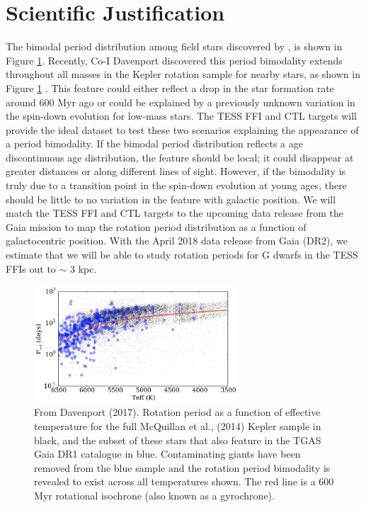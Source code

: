 \documentclass[useAMS, usenatbib, preprint, 12pt]{aastex}
\begin{document}
\section{Scientific Justification}

The bimodal period distribution among field stars discovered by
\citet{mcquillan2013}, is shown in Figure \ref{fig:davenport}.
Recently, Co-I Davenport discovered this period bimodality extends throughout
all masses in the Kepler rotation sample for nearby stars, as shown in Figure
\ref{fig:davenport} \citep{davenport2017}.
This feature could either reflect a drop in the star formation rate around 600
Myr ago or could be explained by a previously unknown variation in the
spin-down evolution for low-mass stars.
The TESS FFI and CTL targets will provide the ideal dataset to test these two
scenarios explaining the appearance of a period bimodality.
If the bimodal period distribution reflects a age discontinuous age
distribution, the feature should be local; it could
disappear at greater distances or along different lines of sight.
However, if the bimodality is truly due to a transition point in the spin-down
evolution at young ages, there should be little to no variation in the feature
with galactic position.
We will match the TESS FFI and CTL targets to the upcoming data
release from the Gaia mission \citep{perryman2001} to map the rotation period
distribution as a function of galactocentric position.
With the April 2018 data release from Gaia (DR2), we estimate that we will be
able to study rotation periods for G dwarfs in the TESS FFIs out to $\sim$ 3
kpc.


\begin{figure}
\begin{center}
\includegraphics[width=3in, clip=true]{Davenport.png}
\caption{From Davenport (2017).
    Rotation period as a function of effective
temperature for the full McQuillan et al., (2014) Kepler sample in black, and
the subset of these stars that also feature in the TGAS Gaia DR1 catalogue in
blue. Contaminating giants have been removed from the blue sample and the
rotation period bimodality is revealed to exist across all temperatures shown.
    The red line is a 600 Myr rotational isochrone (also known as a gyrochrone).}
\label{fig:davenport}
\end{center}
\end{figure}
\end{document}
